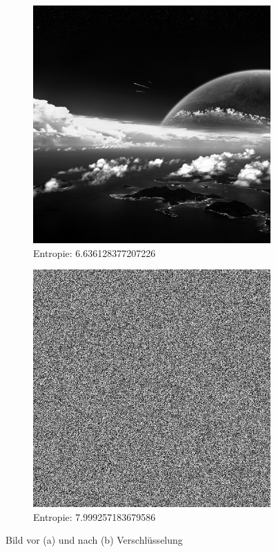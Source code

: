 \begin{figure}
	\centering

	\begin{subfigure}{0.35\textwidth}
		\includegraphics[width=\textwidth]{../1/3/gray_6.636128377207226_planet_sky.jpg}
		\caption{Entropie: 6.636128377207226}
	\end{subfigure}
	\hfill
	\begin{subfigure}{0.35\textwidth}
		\includegraphics[width=\textwidth]{../1/3/encrypted_7.999257183679586_planet_sky.jpg}
		\caption{Entropie: 7.999257183679586}
	\end{subfigure}

	\caption{Bild vor (a) und nach (b) Verschlüsselung}
	\label{fig:sky}
\end{figure}



